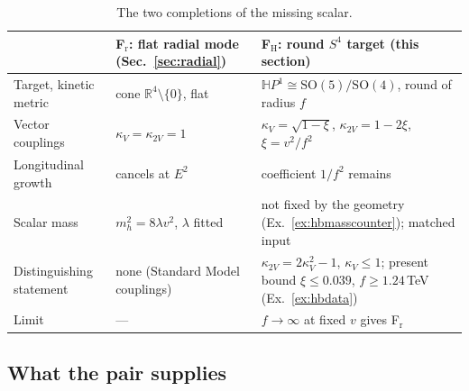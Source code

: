 \documentclass[aps,pra,onecolumn,superscriptaddress,nofootinbib,10pt]{revtex4-2}
\theoremstyle{definition}
\theoremstyle{remark}
\newcommand{\R}{\mathbb{R}}
\newcommand{\HH}{\mathbb{H}}
\newcommand{\SO}{\mathrm{SO}}
\begin{document}
\begin{table}[h]
\caption{The two completions of the missing scalar.}\label{tab:twoscalars}
\footnotesize
\begin{tabular}{@{}p{}p{}p{}@{}}
\toprule
& F$_{\mathrm r}$: flat radial mode (Sec.~\ref{sec:radial}) & F$_{\mathrm H}$: round $S^4$ target (this section)\\
\midrule
Target, kinetic metric & cone $\R^4\setminus\{0\}$, flat & $\HH P^1\cong\SO(5)/\SO(4)$, round of radius $f$\\
Vector couplings & $\kappa_V=\kappa_{2V}=1$ & $\kappa_V=\sqrt{1-\xi}$, $\kappa_{2V}=1-2\xi$, $\xi=v^2/f^2$\\
Longitudinal growth & cancels at $E^2$ & coefficient $1/f^2$ remains\\
Scalar mass & $m_h^2=8\lambda v^2$, $\lambda$ fitted & not fixed by the geometry (Ex.~\ref{ex:hbmasscounter}); matched input\\
Distinguishing statement & none (Standard Model couplings) & $\kappa_{2V}=2\kappa_V^2-1$, $\kappa_V\le1$; present bound $\xi\le0.039$, $f\ge1.24$\,TeV (Ex.~\ref{ex:hbdata})\\
Limit & --- & $f\to\infty$ at fixed $v$ gives F$_{\mathrm r}$\\
\bottomrule
\end{tabular}
\end{table}

\subsection{What the pair supplies}
\end{document}
